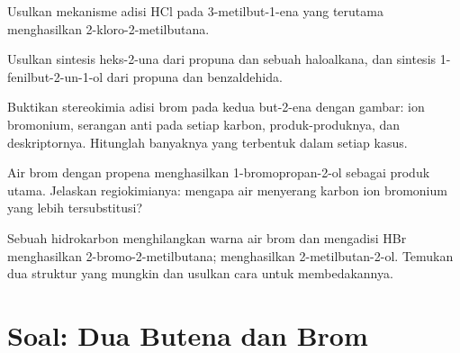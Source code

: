 \begin{exercise}[$\star\star$]\label{exo:b1:electrophilic-additions:8}
Usulkan mekanisme adisi HCl pada 3-metilbut-1-ena yang terutama
menghasilkan 2-kloro-2-metilbutana.
\end{exercise}

\begin{exercise}[$\star\star$]\label{exo:b1:electrophilic-additions:9}
Usulkan sintesis heks-2-una dari propuna dan sebuah haloalkana, dan
sintesis 1-fenilbut-2-un-1-ol dari propuna dan benzaldehida.
\end{exercise}

\begin{exercise}[$\star\star\star$]\label{exo:b1:electrophilic-additions:10}
Buktikan stereokimia adisi brom pada kedua but-2-ena dengan gambar: ion
bromonium, serangan anti pada setiap karbon, 
produk-produknya, dan deskriptornya. Hitunglah banyaknya  yang
terbentuk dalam setiap kasus.
\end{exercise}

\begin{exercise}[$\star\star\star$]\label{exo:b1:electrophilic-additions:11}
Air brom dengan propena menghasilkan 1-bromopropan-2-ol sebagai produk
utama. Jelaskan regiokimianya: mengapa air menyerang karbon ion bromonium
yang lebih tersubstitusi?
\end{exercise}

\begin{exercise}[$\star\star\star$]\label{exo:b1:electrophilic-additions:12}
Sebuah hidrokarbon  menghilangkan warna air brom dan mengadisi
HBr menghasilkan 2-bromo-2-metilbutana;  menghasilkan
2-metilbutan-2-ol. Temukan dua struktur yang mungkin dan usulkan cara
untuk membedakannya.
\end{exercise}

\section{Soal: Dua Butena dan Brom}

